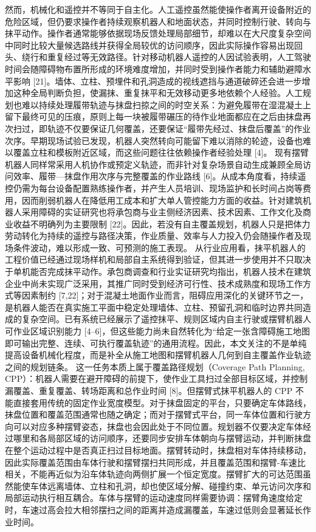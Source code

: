 {}然而，机械化和遥控并不等同于自主化。人工遥控虽然能使操作者离开设备附近的危险区域，但仍要求操作者持续观察机器人和地面状态，并同时控制行驶、转向与抹平动作。操作者通常能够依据现场反馈处理局部细节，却难以在大尺度复杂空间中同时比较大量候选路线并获得全局较优的访问顺序，因此实际操作容易出现回头、绕行和重复经过等无效路径。针对移动机器人遥控的人因试验表明，人工驾驶时间会随障碍物布置所形成的环境难度增加，并同时受到操作者能力和辅助避障水平影响 [21]。墙体、立柱、预埋件和孔洞造成的视线遮挡与通道破碎还会进一步增加这种全局判断负担，使漏抹、重复抹平和无效移动更多地依赖个人经验。人工规划也难以持续处理履带轨迹与抹盘扫掠之间的时空关系：为避免履带在湿混凝土上留下最终可见的压痕，原则上每一块被履带碾压的待作业地面都应在之后由抹盘再次扫过，即轨迹不仅要保证几何覆盖，还要保证“履带先经过、抹盘后覆盖”的作业次序。早期现场试验已发现，机器人突然转向可能留下难以消除的轮迹，设备也难以覆盖立柱和模板附近区域，而这些问题往往依赖操作者经验处理 [4]。\markdownRendererParagraphSeparator
{}现有摆臂机器人同样常采用人机协作或预定义轨迹，而非针对复杂场景自动生成兼顾全局访问效率、履带—抹盘作用次序与完整覆盖的作业路线 [6]。从成本角度看，持续遥控仍需为每台设备配置熟练操作者，并产生人员培训、现场监护和长时间占岗等费用，因而削弱机器人在降低用工成本和扩大单人管控能力方面的收益。针对建筑机器人采用障碍的实证研究也将承包商与业主侧经济因素、技术因素、工作文化及商业收益不明确列为主要限制 [22]。因此，若没有自主覆盖规划，机器人只是把体力劳动转化为持续的遥控与路径决策，作业质量、效率与人力投入仍会随操作者及现场条件波动，难以形成一致、可预测的施工表现。\markdownRendererParagraphSeparator
{}从行业应用看，抹平机器人的工程价值已经通过现场样机和局部自主系统得到验证，但其进一步使用并不只取决于单机能否完成抹平动作。承包商调查和行业实证研究均指出，机器人技术在建筑企业中尚未实现广泛采用，其推广同时受到经济可行性、技术成熟度和现场工作方式等因素制约 [7,22]；对于混凝土地面作业而言，阻碍应用深化的关键环节之一，是机器人能否在真实施工平面中稳定处理墙体、立柱、预留孔洞和临时边界共同造成的复杂空间。已有系统已经展示了遥控抹平、规则区域内自主行驶或摆臂机器人可作业区域识别能力 [4–6]，但这些能力尚未自然转化为“给定一张含障碍施工地图即可输出完整、连续、可执行覆盖轨迹”的通用流程。因此，本文关注的不是单纯提高设备机械化程度，而是补全从施工地图和摆臂机器人几何到自主覆盖作业轨迹之间的规划链条。\markdownRendererParagraphSeparator
{}这一任务本质上属于覆盖路径规划（Coverage Path Planning, CPP）：机器人需要在避开障碍的前提下，使作业工具扫过全部目标区域，并控制漏覆盖、重复覆盖、转场距离和总作业时间 [8]。但摆臂式抹平机器人的 CPP 不能直接套用传统的固定作业宽度模型。对于抹盘固定的平台，只要确定车体路线，抹盘位置和覆盖范围通常也随之确定；而对于摆臂式平台，同一车体位置和行驶方向可以对应多种摆臂姿态，抹盘也会因此处于不同位置。规划器不仅要决定车体经过哪里和各局部区域的访问顺序，还要同步安排车体朝向与摆臂运动，并判断抹盘在整个运动过程中是否真正扫过目标地面。摆臂转动时，抹盘相对车体持续移动，因此实际覆盖范围由车体行驶和摆臂摆扫共同形成，并且覆盖范围和摆臂-车速比相关，不能再近似为沿车体轨迹向两侧扩展一个恒定宽度。摆臂扩大的可达范围虽然能使车体远离墙体、立柱和孔洞，却也使区域分解、碰撞约束、单元访问次序和局部运动执行相互耦合。车体与摆臂的运动速度同样需要协调：摆臂角速度给定时，车速过高会拉大相邻摆扫之间的距离并造成漏覆盖，车速过低则会显著延长作业时间。\markdownRendererParagraphSeparator
